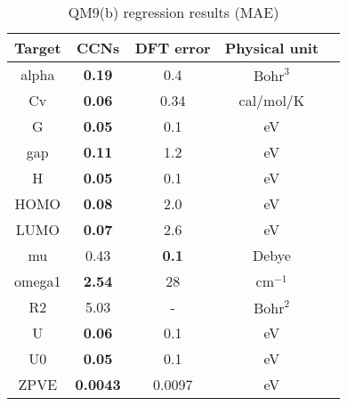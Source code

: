 
\begin{table}
\caption{\label{tbl:qm9mae-b} QM9(b) regression results (MAE)}
\begin{center}
\begin{tabular}{|| c | c | c | c | c ||}
	\hline
	Target              & CCNs				& DFT error		& Physical unit   \\
	\hline\hline
	alpha               & \textbf{0.19}		& 0.4  			& $\text{Bohr}^3$ \\
	\hline
	Cv	                & \textbf{0.06}    	& 0.34			& cal/mol/K \\
	\hline
	G 	                & \textbf{0.05}   	& 0.1			& eV	\\
	\hline
	gap 	            & \textbf{0.11}		& 1.2   		& eV	\\
	\hline
	H 	                & \textbf{0.05}		& 0.1			& eV  \\
	\hline
	HOMO 	            & \textbf{0.08}		& 2.0  			& eV \\
	\hline
	LUMO 	            & \textbf{0.07}		& 2.6			& eV \\
	\hline
	mu	 				& 0.43				& \textbf{0.1}	& Debye	\\
	\hline
	omega1 				& \textbf{2.54}		& 28			& $\text{cm}^{-1}$	\\
	\hline
	R2	 				& 5.03				& -				& $\text{Bohr}^2$ \\
	\hline
	U	 	            & \textbf{0.06}		& 0.1			& eV  \\
	\hline
	U0	                & \textbf{0.05}		& 0.1			& eV	\\
	\hline
	ZPVE 	            & \textbf{0.0043}	& 0.0097		& eV \\
	\hline
\end{tabular}
\end{center}
\end{table}
